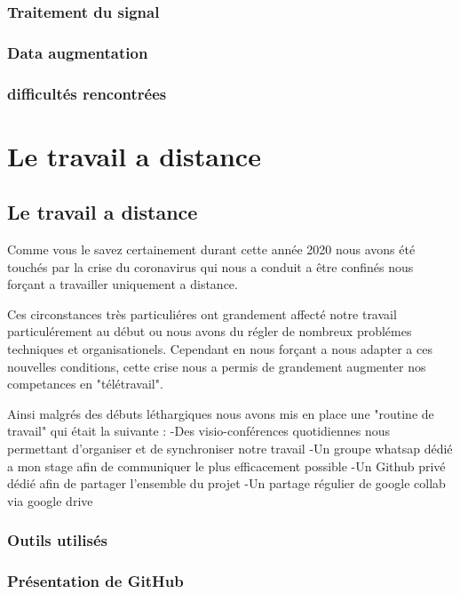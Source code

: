 {\subsection{Traitement du signal}

\subsection{Data augmentation}


\subsection{difficultés rencontrées}





\chapter{Le travail a distance}\label{Le travail à distance}}
\section{Le travail a distance}


Comme vous le savez certainement durant cette année 2020 nous avons été touchés par la crise du coronavirus qui nous a conduit a être confinés nous forçant a travailler uniquement a distance.

Ces circonstances très particuliéres ont grandement affecté notre travail particulérement au début ou nous avons du régler de nombreux problémes techniques et organisationels. Cependant en nous forçant a nous adapter a ces nouvelles conditions, cette crise nous a permis de grandement augmenter nos competances en "télétravail".

Ainsi malgrés des débuts léthargiques nous avons mis en place une "routine de travail" qui était la suivante :
-Des visio-conférences quotidiennes nous permettant d'organiser et de synchroniser notre travail
-Un groupe whatsap dédié a mon stage afin de communiquer le plus efficacement possible
-Un Github privé dédié afin de partager l'ensemble du projet
-Un partage régulier de google collab via google drive



\subsection{Outils utilisés}

\subsection{Présentation de GitHub}


